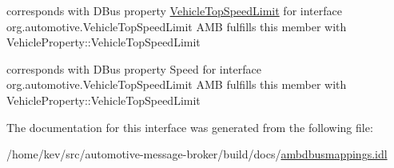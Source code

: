 corresponds with D\+Bus property \hyperlink{interfaceVehicleTopSpeedLimit}{Vehicle\+Top\+Speed\+Limit} for interface org.\+automotive.\+Vehicle\+Top\+Speed\+Limit A\+M\+B fulfills this member with Vehicle\+Property\+::\+Vehicle\+Top\+Speed\+Limit 

corresponds with D\+Bus property Speed for interface org.\+automotive.\+Vehicle\+Top\+Speed\+Limit A\+M\+B fulfills this member with Vehicle\+Property\+::\+Vehicle\+Top\+Speed\+Limit 

The documentation for this interface was generated from the following file\+:\begin{DoxyCompactItemize}
\item 
/home/kev/src/automotive-\/message-\/broker/build/docs/\hyperlink{ambdbusmappings_8idl}{ambdbusmappings.\+idl}\end{DoxyCompactItemize}
